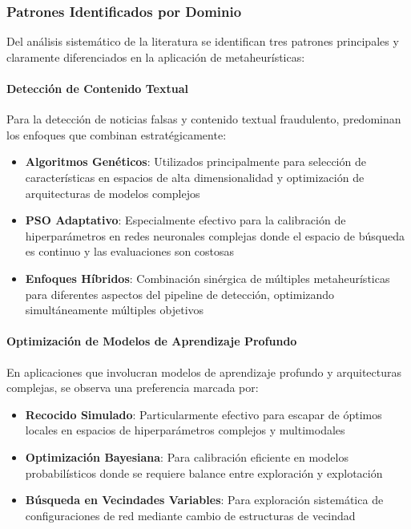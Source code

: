 \subsubsection{Patrones Identificados por Dominio}

Del análisis sistemático de la literatura se identifican tres patrones principales y claramente diferenciados en la aplicación de metaheurísticas:

\paragraph{Detección de Contenido Textual}
Para la detección de noticias falsas y contenido textual fraudulento, predominan los enfoques que combinan estratégicamente:
\begin{itemize}
    \item \textbf{Algoritmos Genéticos}: Utilizados principalmente para selección de características en espacios de alta dimensionalidad y optimización de arquitecturas de modelos complejos \cite{aqil2021modeling, hidayattullah2020financial}
    \item \textbf{PSO Adaptativo}: Especialmente efectivo para la calibración de hiperparámetros en redes neuronales complejas donde el espacio de búsqueda es continuo y las evaluaciones son costosas \cite{deshai2023unmasking, bacanin2023benefits}
    \item \textbf{Enfoques Híbridos}: Combinación sinérgica de múltiples metaheurísticas para diferentes aspectos del pipeline de detección, optimizando simultáneamente múltiples objetivos \cite{yildirim2023novel}
\end{itemize}

\paragraph{Optimización de Modelos de Aprendizaje Profundo}
En aplicaciones que involucran modelos de aprendizaje profundo y arquitecturas complejas, se observa una preferencia marcada por:
\begin{itemize}
    \item \textbf{Recocido Simulado}: Particularmente efectivo para escapar de óptimos locales en espacios de hiperparámetros complejos y multimodales \cite{bacanin2023benefits}
    \item \textbf{Optimización Bayesiana}: Para calibración eficiente en modelos probabilísticos donde se requiere balance entre exploración y explotación \cite{horak2023gaussian}
    \item \textbf{Búsqueda en Vecindades Variables}: Para exploración sistemática de configuraciones de red mediante cambio de estructuras de vecindad \cite{kapunac2023variable}
\end{itemize}

